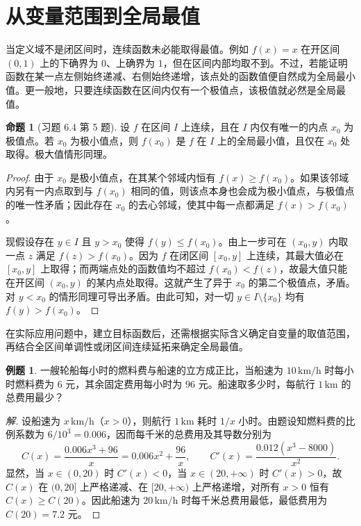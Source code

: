 \documentclass[UTF8,fontset=fandol,a4paper,12pt]{ctexart}
\theoremstyle{definition}
\newtheorem{proposition}[theorem]{命题}
\newtheorem{example}[theorem]{例题}
\begin{document}
\section{从变量范围到全局最值}
当定义域不是闭区间时，连续函数未必能取得最值。例如 $f(x)=x$ 在开区间 $(0,1)$ 上的下确界为 $0$、上确界为 $1$，但在区间内部均取不到。不过，若能证明函数在某一点左侧始终递减、右侧始终递增，该点处的函数值便自然成为全局最小值。更一般地，只要连续函数在区间内仅有一个极值点，该极值就必然是全局最值。

\begin{proposition}[习题 6.4 第 5 题]
设 $f$ 在区间 $I$ 上连续，且在 $I$ 内仅有唯一的内点 $x_0$ 为极值点。若 $x_0$ 为极小值点，则 $f(x_0)$ 是 $f$ 在 $I$ 上的全局最小值，且仅在 $x_0$ 处取得。极大值情形同理。
\end{proposition}

\begin{proof}
由于 $x_0$ 是极小值点，在其某个邻域内恒有 $f(x)\ge f(x_0)$。如果该邻域内另有一内点取到与 $f(x_0)$ 相同的值，则该点本身也会成为极小值点，与极值点的唯一性矛盾；因此存在 $x_0$ 的去心邻域，使其中每一点都满足 $f(x)>f(x_0)$。

现假设存在 $y\in I$ 且 $y>x_0$ 使得 $f(y)\le f(x_0)$。由上一步可在 $(x_0,y)$ 内取一点 $z$ 满足 $f(z)>f(x_0)$。因为 $f$ 在闭区间 $[x_0,y]$ 上连续，其最大值必在 $[x_0,y]$ 上取得；而两端点处的函数值均不超过 $f(x_0)<f(z)$，故最大值只能在开区间 $(x_0,y)$ 的某内点处取得。这就产生了异于 $x_0$ 的第二个极值点，矛盾。对 $y<x_0$ 的情形同理可导出矛盾。由此可知，对一切 $y\in I\setminus\{x_0\}$ 均有 $f(y)>f(x_0)$。
\end{proof}

在实际应用问题中，建立目标函数后，还需根据实际含义确定自变量的取值范围，再结合全区间单调性或闭区间连续延拓来确定全局最值。

\begin{example}
一艘轮船每小时的燃料费与船速的立方成正比，当船速为 $10\,\mathrm{km/h}$ 时每小时燃料费为 $6$ 元，其余固定费用每小时为 $96$ 元。船速取多少时，每航行 $1\,\mathrm{km}$ 的总费用最少？
\end{example}

\begin{proof}[解]
设船速为 $x\,\mathrm{km/h}$（$x>0$），则航行 $1\,\mathrm{km}$ 耗时 $1/x$ 小时。由题设知燃料费的比例系数为 $6/10^3=0.006$，因而每千米的总费用及其导数分别为
\[
 C(x)=\frac{0.006x^3+96}{x}=0.006x^2+\frac{96}{x},
 \qquad C'(x)=\frac{0.012(x^3-8000)}{x^2}.
\]
显然，当 $x\in(0,20)$ 时 $C'(x)<0$，当 $x\in(20,+\infty)$ 时 $C'(x)>0$，故 $C(x)$ 在 $(0,20]$ 上严格递减、在 $[20,+\infty)$ 上严格递增，对所有 $x>0$ 恒有 $C(x)\ge C(20)$。因此船速为 $20\,\mathrm{km/h}$ 时每千米总费用最低，最低费用为 $C(20)=7.2$ 元。
\end{proof}
\end{document}
